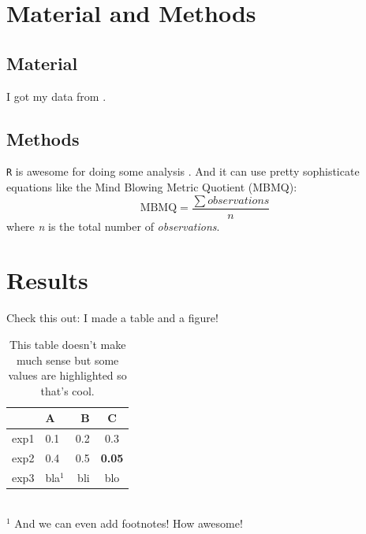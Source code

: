 \documentclass[12pt,letterpaper]{article}
\begin{document}
\section{Material and Methods}
\subsection{Material}
I got my data from \cite{picante}. %

\subsection{Methods}
\label{methods} %
\texttt{R} is awesome for doing some analysis \citep{R}. %
And it can use pretty sophisticate equations like the Mind Blowing Metric Quotient (MBMQ):
  \begin{equation}
  \label{equation}
    \text{MBMQ}=\frac{\sum{observations}}{n}
  \end{equation}
where \textit{n} is the total number of \textit{observations}.

\section{Results}
Check this out: I made a table and a figure!

\begin{table}[!htpb] %
\caption{This table doesn't make much sense but some values are highlighted so that's cool.} %
\label{my_table}
\centering %
\begin{tabular}{c|lr|c} %
   & A & B & C \\ %
   \hline %
  exp1 & 0.1 & 0.2 & 0.3 \\
  exp2 & 0.4 & 0.5 & \textbf{0.05} \\
  exp3 & bla$^1$ & bli & blo \\
\end{tabular} \\
   \small{$^1$ And we can even add footnotes! How awesome!}
\end{table}
\end{document}
